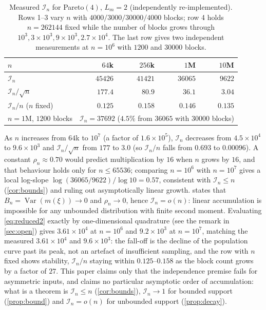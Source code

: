 \documentclass[twocolumn,review,hidelinks,oneeqnum,onetabnum,onefignum,onethmnum]{siamart251216}
\begin{document}
\begin{table}[!tb]
\centering
\caption{Measured $\mathcal I_n$ for Pareto$(4)$, $L_m=2$ (independently
re-implemented). Rows 1--3 vary $n$ with $4000/3000/30000/4000$ blocks; row 4
holds $n=262144$ fixed while the number of blocks grows through
$10^3,3\times10^3,9\times10^3,2.7\times10^4$. The last row gives two independent
measurements at $n=10^6$ with $1200$ and $30000$ blocks.}
\label{tab:bign}
\small
\begin{tabular}{@{}lrrrr@{}}
\toprule
$n$ & $64$k & $256$k & $1$M & $10$M \\
\midrule
$\mathcal I_n$ & $45426$ & $41421$ & $36065$ & $9622$ \\
$\mathcal I_n/\sqrt n$ & $177.4$ & $80.9$ & $36.1$ & $3.04$ \\
$\mathcal I_n/n$ ($n$ fixed) & $0.125$ & $0.158$ & $0.146$ & $0.135$ \\
\midrule
$n=1$M, $1200$ blocks & \multicolumn{4}{c}{$\mathcal I_n=37692$ ($4.5\%$ from $36065$ with $30000$ blocks)} \\
\bottomrule
\end{tabular}
\end{table}

As $n$ increases from $64$k to $10^7$ (a factor of $1.6\times10^5$), $\mathcal I_n$
decreases from $4.5\times10^4$ to $9.6\times10^3$ and $\mathcal I_n/\sqrt n$ from
$177$ to $3.0$ (so $\mathcal I_n/n$ falls from $0.693$ to $0.00096$). A constant
$\rho_n\approx0.70$ would predict multiplication by $16$ when $n$ grows by $16$,
and that behaviour holds only for $n\le65536$; comparing $n=10^6$ with $n=10^7$
gives a local log-slope $\log(36065/9622)/\log 10=0.57$, consistent with
$\mathcal I_n\le n$ (\cref{cor:bounds}) and ruling out asymptotically linear
growth.  states that $B_n=\operatorname{Var}(m(\xi))\to0$ and
$\rho_n\to0$, hence $\mathcal I_n=o(n)$: linear accumulation is impossible for any
unbounded distribution with finite second moment. Evaluating \cref{eq:reduced2}
exactly by one-dimensional quadrature (see the remark in \cref{sec:open}) gives
$3.61\times10^4$ at $n=10^6$ and $9.2\times10^3$ at $n=10^7$, matching the measured
$3.61\times10^4$ and $9.6\times10^3$: the fall-off is the decline of the population
curve past its peak, not an artefact of insufficient sampling, and the row with $n$
fixed shows stability, $\mathcal I_n/n$ staying within $0.125$--$0.158$ as the
block count grows by a factor of $27$. This paper claims only that the independence
premise fails for asymmetric inputs, and claims no particular asymptotic order of
accumulation: what is a theorem is $\mathcal I_n\le n$ (\cref{cor:bounds}),
$\mathcal I_n\to1$ for bounded support (\cref{prop:bound}) and $\mathcal I_n=o(n)$
for unbounded support (\cref{prop:decay}).
\end{document}
